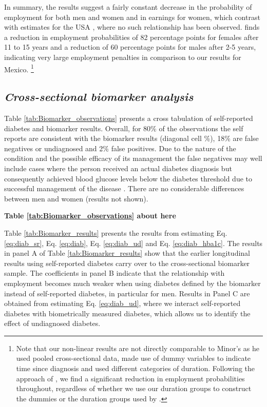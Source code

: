 \documentclass[12pt,english]{article}
\begin{document}
In summary, the results suggest a fairly constant decrease in the probability of employment for both men and women and in earnings for women, which contrast with estimates for the USA \parencite{Minor2013}, where no such relationship has been observed.  \textcite{Minor2013} finds a reduction in employment probabilities of 82 percentage points for females after 11 to 15 years and a reduction of 60 percentage points for males after 2-5 years, indicating very large employment penalties in comparison to our results for Mexico. \footnote{Note that our non-linear results are not directly comparable to Minor's as he used pooled cross-sectional data, made use of dummy variables to indicate time since diagnosis and used different categories of duration. Following the approach of \textcite{Minor2013}, we find a significant reduction in employment probabilities throughout, regardless of whether we use our duration groups to construct the dummies or the duration groups used by \textcite{Minor2013}.} 




\FloatBarrier

\subsection{\textit{Cross-sectional biomarker analysis}}


Table \ref{tab:Biomarker_observations} presents a cross tabulation of self-reported diabetes and biomarker results. Overall, for 80\% of the observations the self reports are consistent with the biomarker results (diagonal cell \%), 18\% are false negatives or undiagnosed and 2\% false positives. Due to the nature of the condition and the possible efficacy of its management the false negatives may well include cases where the person received an actual diabetes diagnosis but consequently achieved blood glucose levels below the diabetes threshold due to successful management of the disease \parencite{Flores-Hernandez2015}.  There are no considerable differences between men and women (results not shown). 
\begin{center}
	\textbf{Table \ref{tab:Biomarker_observations} about here}
\end{center}


Table \ref{tab:Biomarker_results} presents the results from estimating Eq. \ref{eq:diab_sr}, Eq. \ref{eq:diab}, Eq. \ref{eq:diab_ud} and Eq. \ref{eq:diab_hba1c}. The results in panel A of Table \ref{tab:Biomarker_results} show that the earlier longitudinal results using self-reported diabetes carry over to the cross-sectional biomarker sample. The coefficients in panel B indicate that the relationship with employment becomes much weaker when using diabetes defined by the biomarker instead of self-reported diabetes, in particular for men. Results in Panel C are obtained from estimating Eq. \ref{eq:diab_ud}, where we interact self-reported diabetes with biometrically measured diabetes, which allows us to identify the effect of undiagnosed diabetes. 
\end{document}
